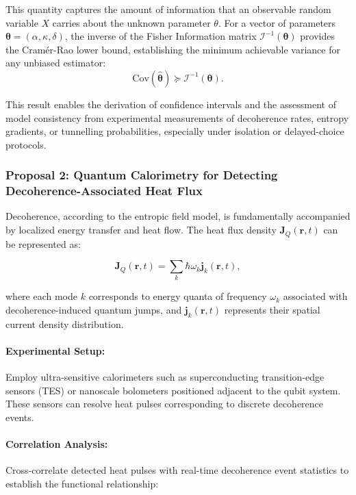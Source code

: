 \documentclass[12pt]{article}
\begin{document}
This quantity captures the amount of information that an observable random variable \(X\) carries about the unknown parameter \(\theta\). For a vector of parameters \(\boldsymbol{\theta} = (\alpha, \kappa, \delta)\), the inverse of the Fisher Information matrix \(\mathcal{I}^{-1}(\boldsymbol{\theta})\) provides the Cramér-Rao lower bound, establishing the minimum achievable variance for any unbiased estimator:
\begin{equation}
\mathrm{Cov}(\hat{\boldsymbol{\theta}}) \succeq \mathcal{I}^{-1}(\boldsymbol{\theta}).
\label{eq:cramer_rao_bound}
\end{equation}

This result enables the derivation of confidence intervals and the assessment of model consistency from experimental measurements of decoherence rates, entropy gradients, or tunnelling probabilities, especially under isolation or delayed-choice protocols.

\subsubsection*{Proposal 2: Quantum Calorimetry for Detecting Decoherence-Associated Heat Flux}

Decoherence, according to the entropic field model, is fundamentally accompanied by localized energy transfer and heat flow. The heat flux density \(\mathbf{J}_Q(\mathbf{r}, t)\) can be represented as:

\begin{equation}
\mathbf{J}_Q(\mathbf{r}, t) = \sum_k \hbar \omega_k \mathbf{j}_k(\mathbf{r}, t),
\label{eq:heat_flux_detailed}
\end{equation}

where each mode \(k\) corresponds to energy quanta of frequency \(\omega_k\) associated with decoherence-induced quantum jumps, and \(\mathbf{j}_k(\mathbf{r}, t)\) represents their spatial current density distribution.

\paragraph{Experimental Setup:} Employ ultra-sensitive calorimeters such as superconducting transition-edge sensors (TES) or nanoscale bolometers positioned adjacent to the qubit system. These sensors can resolve heat pulses corresponding to discrete decoherence events.

\paragraph{Correlation Analysis:} Cross-correlate detected heat pulses with real-time decoherence event statistics to establish the functional relationship:
\end{document}
